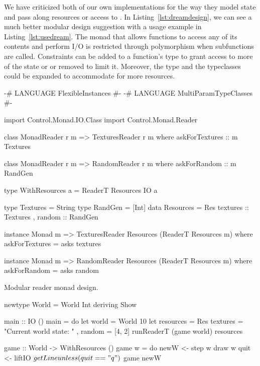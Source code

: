 \documentclass[
  digital, %
  color,   %
  table,   %
  oneside, %
  lof,     %
  lot,     %
]{fithesis3}
\begin{document}
{We have criticized both of our own implementations for the way they model state
and pass along resources or access to . In Listing~\ref{lst:dreamdesign},
we can see a much better modular design suggestion with a usage example in Listing~\ref{lst:usedream}.
The monad that allows functions to access any of its contents and perform I/O
is restricted through polymorphism when subfunctions are called.
Constraints can be added to a function's type to grant access to more of the state or
or removed to limit it. Moreover, the  type and the typeclasses
could be expanded to accommodate for more resources.

\begin{listing}
\begin{haskell}
{-# LANGUAGE FlexibleInstances #-}
{-# LANGUAGE MultiParamTypeClasses #-}

import Control.Monad.IO.Class
import Control.Monad.Reader

class MonadReader r m => TexturesReader r m where
    askForTextures :: m Textures

class MonadReader r m => RandomReader r m where
    askForRandom :: m RandGen

type WithResources a = ReaderT Resources IO a

type Textures = String
type RandGen = [Int]
data Resources =
    Res
    { textures :: Textures
    , random   :: RandGen
    }

instance Monad m => TexturesReader Resources (ReaderT Resources m) where
    askForTextures = asks textures

instance Monad m => RandomReader Resources (ReaderT Resources m) where
    askForRandom = asks random
\end{haskell}
\caption{Modular reader monad design.}
\label{lst:dreamdesign}
\end{listing}

\begin{listing}
\begin{haskell}
newtype World = World Int deriving Show

main :: IO ()
main = do
    let world = World 10
    let resources = Res  
            { textures = "Current world state: "
            , random = [4, 2]
            }
    runReaderT (game world) resources  

game :: World -> WithResources ()
game w = do
    newW <- step w
    draw w
    quit <- liftIO $ getLine
    unless (quit == "q") $
        game newW


\end{haskell}
\end{listing}}
\end{document}
